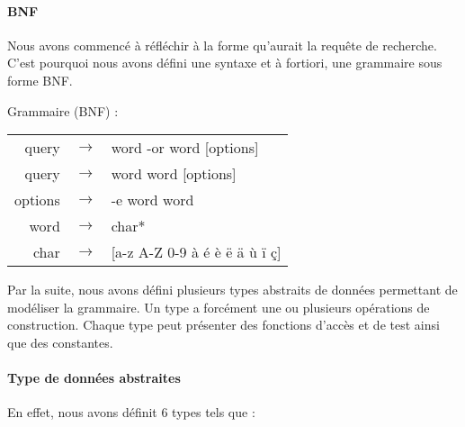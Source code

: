 \paragraph{BNF}
Nous avons commencé à réfléchir à la forme qu'aurait la requête de recherche. 
C'est pourquoi nous avons défini une syntaxe et à fortiori, une grammaire sous forme BNF.

Grammaire (BNF) :\\
\begin{tabular}{r c l}
query &$\rightarrow$ & word { -or word } [options]\\
query &$\rightarrow$ & word { word } [options] \\
	 
options&$\rightarrow$ &-e word {word}\\
word   &$\rightarrow$ &char*\\
char   &$\rightarrow$ & [a-z A-Z 0-9 à é è ë ä ù ï ç]\\ 
\end{tabular}

Par la suite, nous avons défini plusieurs types abstraits de données permettant de modéliser la grammaire.
Un type a forcément une ou plusieurs opérations de construction. 
Chaque type peut présenter des fonctions d'accès et de test ainsi que des constantes.

\paragraph{Type de données abstraites}
En effet, nous avons définit 6 types tels que :

